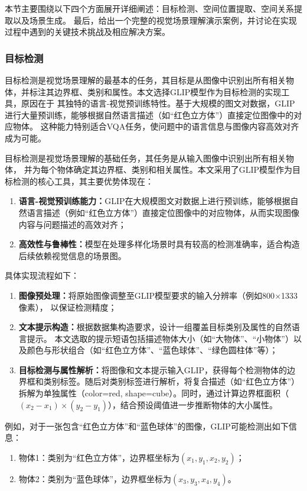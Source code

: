 本节主要围绕以下四个方面展开详细阐述：目标检测、空间位置提取、空间关系提取以及场景生成。
最后，给出一个完整的视觉场景理解演示案例，并讨论在实现过程中遇到的关键技术挑战及相应解决方案。
\subsubsection{目标检测}
目标检测是视觉场景理解的最基本的任务，其目标是从图像中识别出所有相关物体，并标注其边界框、类别和属性。本文选择GLIP模型作为目标检测的实现工具，原因在于
其独特的语言-视觉预训练特性。基于大规模的图文对数据，GLIP进行大量预训练，能够根据自然语言描述（如“红色立方体”）直接定位图像中的对应物体。
这种能力特别适合VQA任务，使问题中的语言信息与图像内容高效对齐成为可能。

目标检测是视觉场景理解的基础任务，其任务是从输入图像中识别出所有相关物体，
并为每个物体确定其边界框、类别和相关属性。本文采用了GLIP模型作为目标检测的核心工具，其主要优势体现在：
\begin{enumerate}[nosep] 
\item \textbf{语言-视觉预训练能力：}GLIP在大规模图文对数据上进行预训练，能够根据自然语言描述（例如“红色立方体”）直接定位图像中的对应物体，从而实现图像内容与问题描述的高效对齐； 
\item \textbf{高效性与鲁棒性：}模型在处理多样化场景时具有较高的检测准确率，适合构造后续依赖视觉信息的场景图。 
\end{enumerate}

具体实现流程如下：
\begin{enumerate}[nosep] 
\item \textbf{图像预处理：}将原始图像调整至GLIP模型要求的输入分辨率（例如800$\times$1333像素），
以保证检测精度； 
\item \textbf{文本提示构造：}根据数据集构造要求，设计一组覆盖目标类别及属性的自然语言提示。
本文选取的提示短语包括描述物体大小（如“大物体”、“小物体”）以及颜色与形状组合（如“红色立方体”、“蓝色球体”、“绿色圆柱体”等）； 
\item \textbf{目标检测与属性解析：}将图像和文本提示输入GLIP，获得每个检测物体的边界框和类别标签。随后对类别标签进行解析，将复合描述（如“红色立方体”）拆解为单独属性（color=red, shape=cube）。同时，通过计算边界框面积（$(x_2 - x_1)\times(y_2 - y_1)$），结合预设阈值进一步推断物体的大小属性。 
\end{enumerate}

例如，对于一张包含“红色立方体”和“蓝色球体”的图像，GLIP可能检测出如下信息： 
\begin{enumerate}[nosep] 
\item 物体1：类别为“红色立方体”，边界框坐标为$(x_1, y_1, x_2, y_2)$； 
\item 物体2：类别为“蓝色球体”，边界框坐标为$(x_3, y_3, x_4, y_4)$。 
\end{enumerate}
